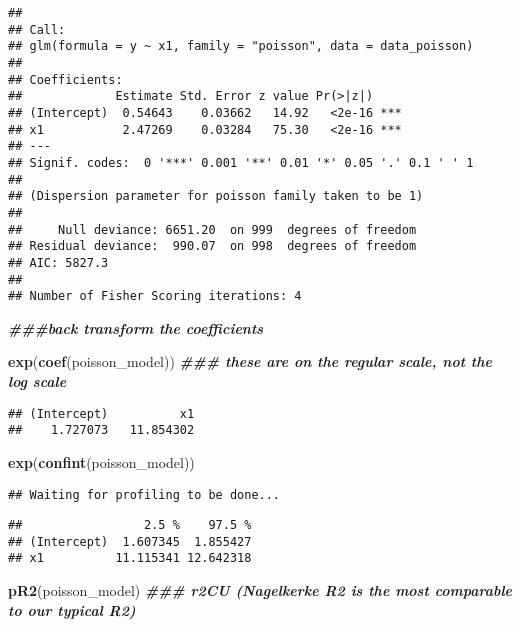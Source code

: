 \documentclass[
]{article}
\newenvironment{Shaded}{\begin{snugshade}}{\end{snugshade}}
\newcommand{\DocumentationTok}[1]{\textcolor[rgb]{0.56,0.35,0.01}{\textbf{\textit{#1}}}}
\newcommand{\FunctionTok}[1]{\textcolor[rgb]{0.13,0.29,0.53}{\textbf{#1}}}
\newcommand{\NormalTok}[1]{#1}
\begin{document}
\begin{verbatim}
## 
## Call:
## glm(formula = y ~ x1, family = "poisson", data = data_poisson)
## 
## Coefficients:
##             Estimate Std. Error z value Pr(>|z|)    
## (Intercept)  0.54643    0.03662   14.92   <2e-16 ***
## x1           2.47269    0.03284   75.30   <2e-16 ***
## ---
## Signif. codes:  0 '***' 0.001 '**' 0.01 '*' 0.05 '.' 0.1 ' ' 1
## 
## (Dispersion parameter for poisson family taken to be 1)
## 
##     Null deviance: 6651.20  on 999  degrees of freedom
## Residual deviance:  990.07  on 998  degrees of freedom
## AIC: 5827.3
## 
## Number of Fisher Scoring iterations: 4
\end{verbatim}

\begin{Shaded}
\begin{Highlighting}[]
\DocumentationTok{\#\#\#back transform the coefficients }

\FunctionTok{exp}\NormalTok{(}\FunctionTok{coef}\NormalTok{(poisson\_model)) }\DocumentationTok{\#\#\# these are on the \textquotesingle{}regular\textquotesingle{} scale, not the log scale}
\end{Highlighting}
\end{Shaded}

\begin{verbatim}
## (Intercept)          x1 
##    1.727073   11.854302
\end{verbatim}

\begin{Shaded}
\begin{Highlighting}[]
\FunctionTok{exp}\NormalTok{(}\FunctionTok{confint}\NormalTok{(poisson\_model))}
\end{Highlighting}
\end{Shaded}

\begin{verbatim}
## Waiting for profiling to be done...
\end{verbatim}

\begin{verbatim}
##                 2.5 %    97.5 %
## (Intercept)  1.607345  1.855427
## x1          11.115341 12.642318
\end{verbatim}

\begin{Shaded}
\begin{Highlighting}[]
\FunctionTok{pR2}\NormalTok{(poisson\_model) }\DocumentationTok{\#\#\# r2CU (Nagelkerke R2 is the most comparable to our typical R2) }
\end{Highlighting}
\end{Shaded}
\end{document}
